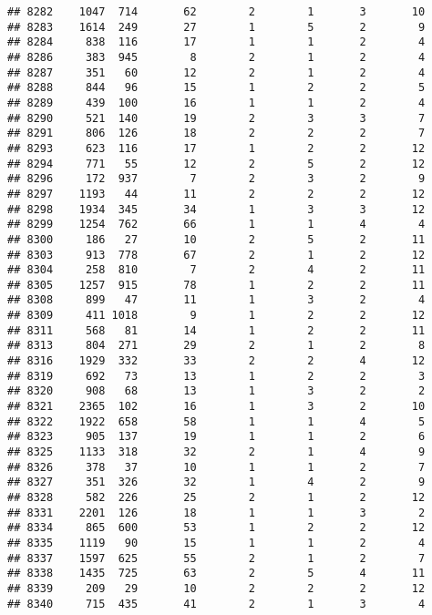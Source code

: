 \documentclass[]{article}
\begin{document}
\begin{verbatim}
## 8282    1047  714       62        2        1       3       10
## 8283    1614  249       27        1        5       2        9
## 8284     838  116       17        1        1       2        4
## 8286     383  945        8        2        1       2        4
## 8287     351   60       12        2        1       2        4
## 8288     844   96       15        1        2       2        5
## 8289     439  100       16        1        1       2        4
## 8290     521  140       19        2        3       3        7
## 8291     806  126       18        2        2       2        7
## 8293     623  116       17        1        2       2       12
## 8294     771   55       12        2        5       2       12
## 8296     172  937        7        2        3       2        9
## 8297    1193   44       11        2        2       2       12
## 8298    1934  345       34        1        3       3       12
## 8299    1254  762       66        1        1       4        4
## 8300     186   27       10        2        5       2       11
## 8303     913  778       67        2        1       2       12
## 8304     258  810        7        2        4       2       11
## 8305    1257  915       78        1        2       2       11
## 8308     899   47       11        1        3       2        4
## 8309     411 1018        9        1        2       2       12
## 8311     568   81       14        1        2       2       11
## 8313     804  271       29        2        1       2        8
## 8316    1929  332       33        2        2       4       12
## 8319     692   73       13        1        2       2        3
## 8320     908   68       13        1        3       2        2
## 8321    2365  102       16        1        3       2       10
## 8322    1922  658       58        1        1       4        5
## 8323     905  137       19        1        1       2        6
## 8325    1133  318       32        2        1       4        9
## 8326     378   37       10        1        1       2        7
## 8327     351  326       32        1        4       2        9
## 8328     582  226       25        2        1       2       12
## 8331    2201  126       18        1        1       3        2
## 8334     865  600       53        1        2       2       12
## 8335    1119   90       15        1        1       2        4
## 8337    1597  625       55        2        1       2        7
## 8338    1435  725       63        2        5       4       11
## 8339     209   29       10        2        2       2       12
## 8340     715  435       41        2        1       3        4

\end{verbatim}
\end{document}
